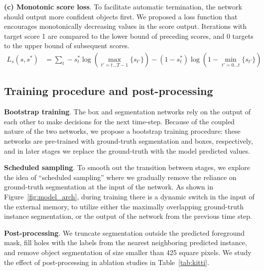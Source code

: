 \textbf{(c) Monotonic score loss}. To facilitate automatic termination, the
network should output more confident objects first. We proposed a loss function
that encourages monotonically decreasing values in the score output. Iterations
with target score 1 are compared to the lower bound of preceding scores, and 0
targets to the upper bound of subsequent scores.
\vspace{-3pt}
\begin{align}
L_s(s, s^*) &= \sum_t -s^*_t 
\log\left(\max_{t'=t...T-1} \{s_{t'}\}\right) - (1 - s^*_t)
\log\left(1 - \min_{t'=0...t} \{s_{t'}\}\right)
\end{align}

\subsection{Training procedure and post-processing}
\vspace{-3pt}

\textbf{Bootstrap training}. The box and segmentation networks rely on the
output of each other to make decisions for the next time-step. Because of the
coupled nature of the two networks, we propose a bootstrap training procedure:
these networks are pre-trained with ground-truth segmentation and boxes, 
respectively, and in later stages we replace the ground-truth with the model 
predicted values.

\textbf{Scheduled sampling}. To smooth out the transition between stages, we
explore the idea of ``scheduled sampling'' \cite{bengio15schedsamp} where we
gradually remove the reliance on ground-truth segmentation at the input of the
network. As shown in Figure~\ref{fig:model_arch}, during training there
is a dynamic switch in the input of the external memory, to utilize either the
maximally overlapping ground-truth instance segmentation, or the 
output of the network from the previous time step.

\textbf{Post-processing}. We truncate segmentation outside the predicted
foreground mask, fill holes with the labels from the nearest neighboring
predicted instance, and remove object segmentation of size smaller than 425
square pixels. We study the effect of post-processing in ablation studies in
Table~\ref{tab:kitti}.

